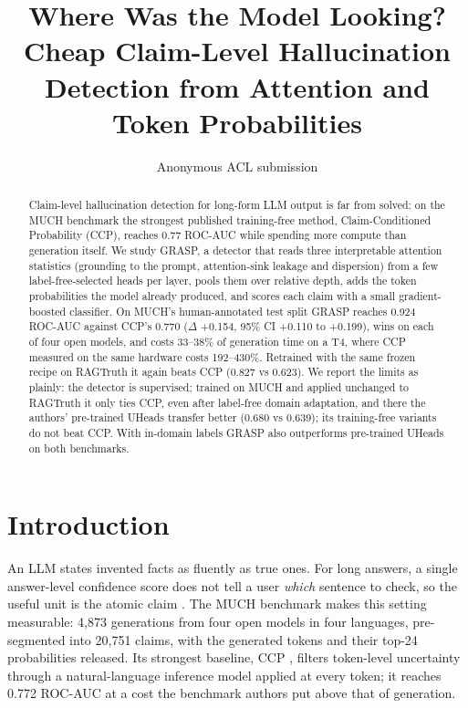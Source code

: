 \documentclass[11pt]{article}
\title{Where Was the Model Looking? Cheap Claim-Level Hallucination\\ Detection from Attention and Token Probabilities}
\author{Anonymous ACL submission}
\begin{document}
\maketitle

\begin{abstract}
Claim-level hallucination detection for long-form LLM output is far from solved: on the
MUCH benchmark the strongest published training-free method, Claim-Conditioned Probability
(CCP), reaches 0.77 ROC-AUC while spending more compute than generation itself. We study
GRASP, a detector that reads three interpretable attention statistics (grounding to the
prompt, attention-sink leakage and dispersion) from a few label-free-selected heads per layer,
pools them over relative depth, adds the token probabilities the model already produced, and
scores each claim with a small gradient-boosted classifier. On MUCH's human-annotated test
split GRASP reaches 0.924 ROC-AUC against CCP's 0.770 ($\Delta$ +0.154, 95\% CI
+0.110 to +0.199), wins on each of four open models, and costs 33--38\% of generation time
on a T4, where CCP measured on the same hardware costs 192--430\%. Retrained with the same
frozen recipe on RAGTruth it again beats CCP (0.827 vs 0.623). We report the limits as
plainly: the detector is supervised; trained on MUCH and applied unchanged to RAGTruth it only
ties CCP, even after label-free domain adaptation, and there the authors' pre-trained UHeads
transfer better (0.680 vs 0.639); its training-free variants do not beat CCP. With in-domain
labels GRASP also outperforms pre-trained UHeads on both benchmarks.
\end{abstract}

\section{Introduction}
An LLM states invented facts as fluently as true ones. For long answers, a single
answer-level confidence score does not tell a user \emph{which} sentence to check, so the useful
unit is the atomic claim \citep{min-etal-2023-factscore}. The MUCH benchmark
\citep{dentan2026muchmultilingualclaimhallucination} makes this setting measurable: 4,873
generations from four open models in four languages, pre-segmented into 20,751 claims, with the
generated tokens and their top-24 probabilities released. Its strongest baseline, CCP
\citep{fadeeva-etal-2024-fact}, filters token-level uncertainty through a natural-language
inference model applied at every token; it reaches 0.772 ROC-AUC at a cost the benchmark authors
put above that of generation.
\end{document}
